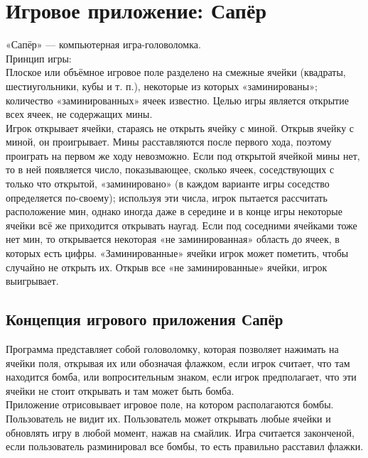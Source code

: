 




\tableofcontents
\newpage

\section{Игровое приложение: Сапёр}

«Сапёр» — компьютерная игра-головоломка.\\

Принцип игры:\\

Плоское или объёмное игровое поле разделено на смежные ячейки (квадраты, шестиугольники, кубы и т. п.), некоторые из которых «заминированы»; количество «заминированных» ячеек известно. Целью игры является открытие всех ячеек, не содержащих мины.\\

Игрок открывает ячейки, стараясь не открыть ячейку с миной. Открыв ячейку с миной, он проигрывает. Мины расставляются после первого хода, поэтому проиграть на первом же ходу невозможно. Если под открытой ячейкой мины нет, то в ней появляется число, показывающее, сколько ячеек, соседствующих с только что открытой, «заминировано» (в каждом варианте игры соседство определяется по-своему); используя эти числа, игрок пытается рассчитать расположение мин, однако иногда даже в середине и в конце игры некоторые ячейки всё же приходится открывать наугад. Если под соседними ячейками тоже нет мин, то открывается некоторая «не заминированная» область до ячеек, в которых есть цифры. «Заминированные» ячейки игрок может пометить, чтобы случайно не открыть их. Открыв все «не заминированные» ячейки, игрок выигрывает.

\subsection{Концепция игрового приложения Сапёр}

Программа представляет собой головоломку, которая позволяет нажимать на ячейки поля, открывая их или обозначая флажком, если игрок считает, что там находится бомба, или вопросительным знаком, если игрок предполагает, что эти ячейки не стоит открывать и там может быть бомба.\\

Приложение отрисовывает игровое поле, на котором располагаются бомбы. Пользователь не видит их. Пользователь может открывать любые ячейки и обновлять игру в любой момент, нажав на смайлик. Игра считается законченой, если пользователь разминировал все бомбы, то есть правильно расставил флажки.

